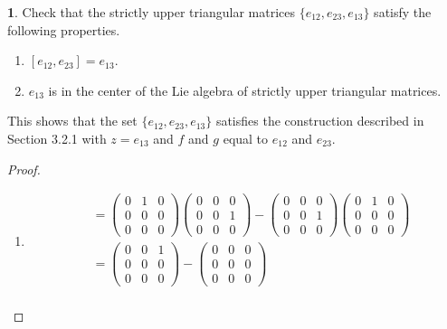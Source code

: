 \documentclass[12pt]{article}
\theoremstyle{definition}
\newtheorem{ex}{}
\begin{document}
\begin{ex}
	Check that the strictly upper triangular matrices $\lbrace e_{12}, e_{23}, e_{13} \rbrace$ satisfy the following properties.
	\begin{enumerate}[label=(\alph*)]
		\item $[e_{12}, e_{23}] = e_{13}$.
		\item $e_{13}$ is in the center of the Lie algebra of strictly upper triangular matrices.
	\end{enumerate}
	This shows that the set $\lbrace e_{12}, e_{23}, e_{13} \rbrace$ satisfies the construction described in Section 3.2.1 with $z = e_{13}$ and $f$ and $g$ equal to $e_{12}$ and $e_{23}$.
\end{ex}
\begin{proof}\
	\begin{enumerate}[label=(\alph*)]
		\item \begin{align*}
			      [e_{12}, e_{23}] & = \begin{pmatrix}0 & 1 & 0 \\ 0 & 0 & 0 \\ 0 & 0 & 0\end{pmatrix}\begin{pmatrix}0 & 0 & 0 \\ 0 & 0 & 1 \\ 0 & 0 & 0\end{pmatrix} - \begin{pmatrix}0 & 0 & 0 \\ 0 & 0 & 1 \\ 0 & 0 & 0\end{pmatrix}\begin{pmatrix}0 & 1 & 0 \\ 0 & 0 & 0 \\ 0 & 0 & 0\end{pmatrix} \\
			                       & = \begin{pmatrix}0 & 0 & 1 \\ 0 & 0 & 0 \\ 0 & 0 & 0\end{pmatrix} - \begin{pmatrix}0 & 0 & 0 \\ 0 & 0 & 0 \\ 0 & 0 & 0\end{pmatrix}                                                                                                                               \\

\end{align*}
\end{enumerate}
\end{proof}
\end{document}
